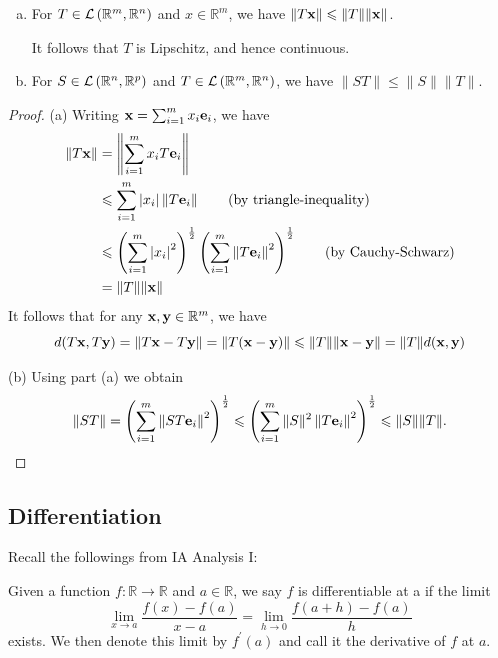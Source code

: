 \documentclass[a4paper,11pt]{article}
\begin{document}
\begin{lemma}\label{lma:11.1}
    \begin{enumerate}[(a)]
        \item For $T \in {\mathcal{L}}\left(\mathbb{R}^{m}, \mathbb{R}^{n}\right)$ and $x \in \mathbb{R}^{m}$, we have $\|T {\bf x}\| \leqslant\|T\|\|{\bf x}\|$.

        It follows that $T$ is Lipschitz, and hence continuous.
        
        \item For $S \in {\mathcal{L}}\left(\mathbb{R}^{n}, \mathbb{R}^{p}\right)$ and $T \in {\mathcal{L}}\left(\mathbb{R}^{m}, \mathbb{R}^{n}\right)$, we have $\|S T\| \leqslant\|S\|\|T\|$.
    \end{enumerate}
\end{lemma}
\begin{proof}
    (a) Writing ${\bf x}=\sum_{i=1}^{m} x_{i} {\bf e}_{i}$, we have
\begin{align*}
\|T {\bf x}\| &=\left\|\sum_{i=1}^{m} x_{i} T {\bf e}_{i}\right\| \\
& \leqslant \sum_{i=1}^{m}\left|x_{i}\right|\left\|T {\bf e}_{i}\right\| \tag{by triangle-inequality}\\
& \leqslant\left(\sum_{i=1}^{m}\left|x_{i}\right|^{2}\right)^{\frac{1}{2}}\left(\sum_{i=1}^{m}\left\|T {\bf e}_{i}\right\|^{2}\right)^{\frac{1}{2}} \tag{by Cauchy-Schwarz}\\
&=\|T\|\|{\bf x}\|
\end{align*}
It follows that for any ${\bf x}, {\bf y} \in \mathbb{R}^{m}$, we have
$$
d(T {\bf x}, T {\bf y})=\|T {\bf x}-T {\bf y}\|=\|T({\bf x}-{\bf y})\| \leqslant\|T\|\|{\bf x}-{\bf y}\|=\|T\| d({\bf x}, {\bf y})
$$

(b) Using part (a) we obtain
$$
\|S T\|=\left(\sum_{i=1}^{m}\left\|S T {\bf e}_{i}\right\|^{2}\right)^{\frac{1}{2}} \leqslant\left(\sum_{i=1}^{m}\|S\|^{2}\left\|T {\bf e}_{i}\right\|^{2}\right)^{\frac{1}{2}} \leqslant\|S\|\|T\|.\qedhere
$$
\end{proof}

\subsection{Differentiation}
Recall the followings from IA Analysis I:

Given a function $f: \mathbb{R} \rightarrow \mathbb{R}$ and $a \in \mathbb{R}$, we say $f$ is differentiable at a if the limit
$$
\lim _{x \rightarrow a} \frac{f(x)-f(a)}{x-a}=\lim _{h \rightarrow 0} \frac{f(a+h)-f(a)}{h}
$$
exists. We then denote this limit by $f^{\prime}(a)$ and call it the derivative of $f$ at $a$. 
\end{document}
